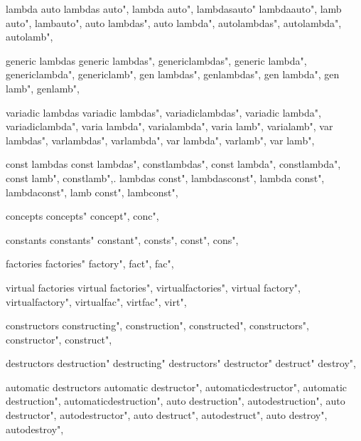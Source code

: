          lambda auto
        lambdas auto",
        lambda auto",
        lambdasauto"
        lambdaauto",
        lamb auto",
        lambauto",
        auto lambdas",
        auto lambda",
        autolambdas",
        autolambda",
        autolamb",
        
         generic lambdas
        generic lambdas",  
        genericlambdas",  
        generic lambda",  
        genericlambda",  
        genericlamb",  
        gen lambdas",  
        genlambdas",  
        gen lambda",  
        gen lamb",  
        genlamb",  
        
         variadic lambdas 
        variadic lambdas",  
        variadiclambdas",  
        variadic lambda",  
        variadiclambda",  
        varia lambda",  
        varialambda",  
        varia lamb",  
        varialamb",  
        var lambdas",  
        varlambdas",  
        varlambda",  
        var lambda",  
        varlamb",  
        var lamb",  
        
         const lambdas 
        const lambdas",
        constlambdas",
        const lambda",
        constlambda",
        const lamb",
        constlamb",.
        lambdas const",
        lambdasconst",
        lambda const",
        lambdaconst",
        lamb const",
        lambconst",
        
         concepts 
        concepts"
        concept",
        conc",
        
         constants 
        constants"
        constant",
        consts",
        const", 
        cons",
        
         factories 
        factories"
        factory",
        fact",
        fac",
        
         virtual factories 
        virtual factories",  
        virtualfactories",  
        virtual factory",  
        virtualfactory",  
        virtualfac",  
        virtfac",  
        virt",  
        
         constructors 
        constructing",
        construction",
        constructed",
        constructors",
        constructor",
        construct",
        
         destructors
        destruction" 
        destructing" 
        destructors" 
        destructor" 
        destruct" 
        destroy", 
        
         automatic destructors 
        automatic destructor",  
        automaticdestructor",  
        automatic destruction", 
        automaticdestruction", 
        auto destruction",  
        autodestruction",  
        auto destructor",  
        autodestructor",  
        auto destruct",  
        autodestruct",  
        auto destroy",  
        autodestroy",  
        
